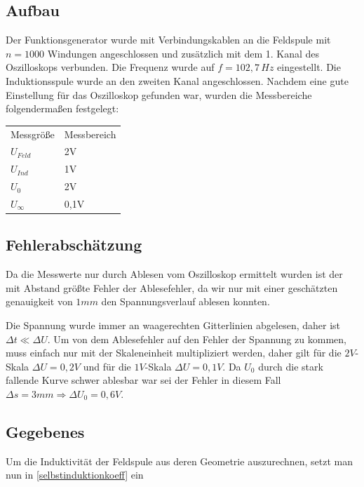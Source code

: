 \documentclass{article}
\begin{document}
\subsection{Aufbau}
Der Funktionsgenerator wurde mit Verbindungskablen an die Feldspule mit \(n=1000\) Windungen angeschlossen und zusätzlich mit dem 1. Kanal des Oszilloskops verbunden. Die Frequenz wurde auf \(f=102,7\,Hz\) eingestellt. Die Induktionsspule wurde an den zweiten Kanal angeschlossen. Nachdem eine gute Einstellung für das Oszilloskop gefunden war, wurden die Messbereiche folgendermaßen festgelegt:
\begin{center}
\begin{tabular}{l l} 
Messgröße & Messbereich \\
  \(U_{Feld}\) & 2V \\ 
  \(U_{Ind}\) & 1V \\ 
  \(U_0\) & 2V \\ 
  \(U_\infty \) & 0,1V \\ 
 \end{tabular}
\end{center}

\subsection{Fehlerabschätzung}

Da die Messwerte nur durch Ablesen vom Oszilloskop ermittelt wurden ist der mit Abstand größte Fehler der Ablesefehler, da wir nur mit einer geschätzten genauigkeit von \( 1mm \) den Spannungsverlauf ablesen konnten.

Die Spannung wurde immer an waagerechten Gitterlinien abgelesen, daher ist \(\Delta t \ll \Delta U \). Um von dem Ablesefehler auf den Fehler der Spannung zu kommen, muss einfach nur mit der Skaleneinheit multipliziert werden, daher gilt für die \(2V\)-Skala \(\Delta U = 0,2V\) und für die \(1V\)-Skala \(\Delta U = 0,1V\). Da \(U_0\) durch die stark fallende Kurve schwer ablesbar war sei der Fehler in diesem Fall \(\Delta s = 3mm \Rightarrow \Delta U_0 = 0,6V \).

\subsection{Gegebenes}

Um die Induktivität der Feldspule aus deren Geometrie auszurechnen, setzt man nun in \eqref{selbstinduktionkoeff} ein
\end{document}
